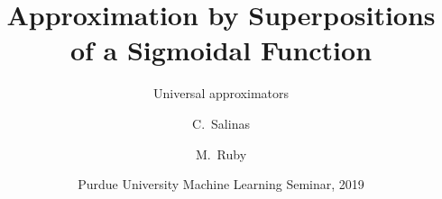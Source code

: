 \documentclass[12pt,letterpape]{beamer}
\title[Approximation by Superpositions] 
{Approximation by Superpositions of a Sigmoidal Function}
\subtitle{Universal approximators}
\author[Salinas, Ruby] 
{C.~Salinas\inst{1} \and M.~Ruby\inst{1}}
\institute[Universities Here and There] %
{
  \inst{1}%
  Department of Mathematics\\
  Purdue University
 }
\date[Spring 2019] %
{Purdue University Machine Learning Seminar, 2019}
\begin{document}
\frame{\titlepage}
\end{document}
